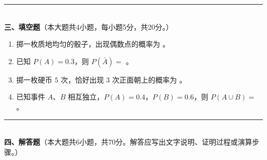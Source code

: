 \documentclass[12pt, a4paper]{ctexart}
\begin{document}
\noindent\rule{\textwidth}{0.4pt}\\[2pt]
{\large\bfseries 三、填空题}（本大题共4小题，每小题5分，共20分。）

\vspace{6pt}

\begin{enumerate}[resume]
\item 掷一枚质地均匀的骰子，出现偶数点的概率为 \underline{\hspace{2cm}}。

\item 已知 $P(A)=0.3$，则 $P(\bar{A})=$ \underline{\hspace{2cm}}。

\item 掷一枚硬币 $5$ 次，恰好出现 $3$ 次正面朝上的概率为 \underline{\hspace{2cm}}。

\item 已知事件 $A$、$B$ 相互独立，$P(A)=0.4$，$P(B)=0.6$，则 $P(A\cup B)=$ \underline{\hspace{2cm}}。
\end{enumerate}

\vspace{6pt}

\noindent\rule{\textwidth}{0.4pt}\\[2pt]
{\large\bfseries 四、解答题}（本大题共6小题，共70分。解答应写出文字说明、证明过程或演算步骤。）

\vspace{6pt}
\end{document}
